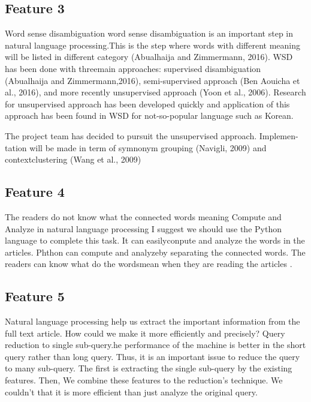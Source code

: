 \documentclass[a4paper]{article} %
\begin{document}
	\subsection*{Feature 3 }
	\label{task1:feature3}
	Word sense disambiguation
	word sense disambiguation is an important step in natural language processing.This is the step where words with different meaning will be listed in different category (Abualhaija and Zimmermann, 2016). WSD has been done with threemain approaches: supervised disambiguation (Abualhaija  and  Zimmermann,2016), semi-supervised approach (Ben Aouicha et al., 2016), and more recently unsupervised approach (Yoon et al., 2006). Research for unsupervised approach has been developed quickly and application of this approach has been found in WSD for not-so-popular language such as Korean.
	
	The project team has decided to pursuit the unsupervised approach.  Implemen-tation will be made in term of symnonym grouping (Navigli, 2009) and contextclustering (Wang et al., 2009)
	
	
	\subsection*{Feature 4 }
	\label{task1:feature4}
	The readers do not know what the connected words meaning
	Compute and Analyze in natural language processing
	I suggest we should use the Python language to complete this task.  It can easilyconpute and analyze the words in the articles.  Phthon can compute and analyzeby separating the connected words.  The readers can know what do the wordsmean when they are reading the articles .
	
	
	\subsection*{Feature 5 }
	\label{task1:feature5}
	Natural language processing help us extract the important information from the full text article. How could we make it more efficiently and precisely?
	Query reduction to single sub-query.he performance of the machine is better in the short query rather than long query. Thus, it is an important issue to reduce the query to many sub-query. The first is extracting the single sub-query by the existing features.  Then, We combine these features to the reduction's technique. We couldn't that it is more efficient than just analyze the original query.
	
	
	
	
\end{document}
